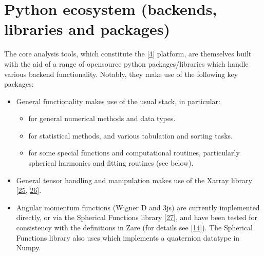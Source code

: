 \documentclass[letterpaper,table,10pt,english]{jupyterBook}
\begin{document}
\section{Python ecosystem (backends, libraries and packages)}
\label{\detokenize{part1/platform_intro_071122:python-ecosystem-backends-libraries-and-packages}}\label{\detokenize{part1/platform_intro_071122:sect-platform-pythonecosystem}}
\sphinxAtStartPar
The core analysis tools, which constitute the  {[}\hyperlink{cite.backmatter/bibliography:id618}{4}{]} platform, are themselves built with the aid of a range of open\sphinxhyphen{}source python packages/libraries which handle various backend functionality. Notably, they make use of the following key packages:
\begin{itemize}
\item {} 
\sphinxAtStartPar
General functionality makes use of the usual  stack, in particular:
\begin{itemize}
\item {} 
\sphinxAtStartPar
{} for general numerical methods and data types.

\item {} 
\sphinxAtStartPar
{} for statistical methods, and various tabulation and sorting tasks.

\item {} 
\sphinxAtStartPar
{} for some special functions and computational routines, particularly spherical harmonics and fitting routines (see below).

\end{itemize}

\item {} 
\sphinxAtStartPar
General tensor handling and manipulation makes use of the Xarray library {[}\hyperlink{cite.backmatter/bibliography:id630}{25}, \hyperlink{cite.backmatter/bibliography:id868}{26}{]}.

\item {} 
\sphinxAtStartPar
Angular momentum functions (Wigner D and 3js) are currently implemented directly, or via the Spherical Functions library {[}\hyperlink{cite.backmatter/bibliography:id483}{27}{]}, and have been tested for consistency with the definitions in Zare (for details see  {[}\hyperlink{cite.backmatter/bibliography:id545}{14}{]}). The Spherical Functions library also uses  which implements a quaternion datatype in Numpy.


\end{itemize}
\end{document}
